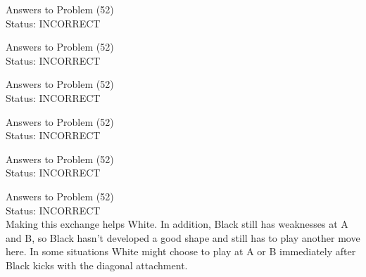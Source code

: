 \documentclass[11pt]{article}
\begin{document}
\begin{minipage}[t]{0.5\textwidth}
  {\centering
  
  Answers to Problem (52)\\
  Status: INCORRECT\\
  
  }
\end{minipage}
\begin{minipage}[t]{0.5\textwidth}
  {\centering
  
  Answers to Problem (52)\\
  Status: INCORRECT\\
  
  }
\end{minipage}
\begin{minipage}[t]{0.5\textwidth}
  {\centering
  
  Answers to Problem (52)\\
  Status: INCORRECT\\
  
  }
\end{minipage}
\begin{minipage}[t]{0.5\textwidth}
  {\centering
  
  Answers to Problem (52)\\
  Status: INCORRECT\\
  
  }
\end{minipage}
\begin{minipage}[t]{0.5\textwidth}
  {\centering
  
  Answers to Problem (52)\\
  Status: INCORRECT\\
  
  }
\end{minipage}
\begin{minipage}[t]{0.5\textwidth}
  {\centering
  
  Answers to Problem (52)\\
  Status: INCORRECT\\
  Making this exchange helps White. In addition, Black still has weaknesses at A and B, so Black hasn't developed a good shape and still has to play another move here. In some situations White might choose to play at A or B immediately after Black kicks with the diagonal attachment.\\
  }
\end{minipage}
\end{document}
